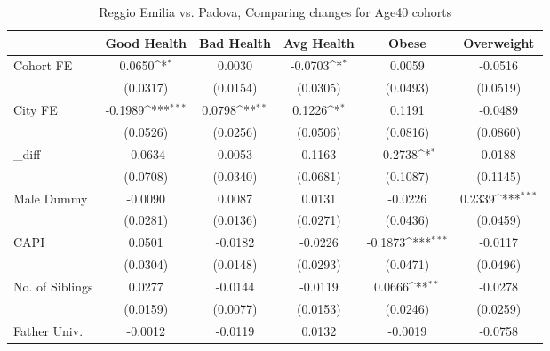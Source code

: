 \begin{table}[htbp]\centering
\def\sym#1{\ifmmode^{#1}\else\(^{#1}\)\fi}
\caption{Reggio Emilia vs. Padova, Comparing changes for Age40 cohorts}
\begin{tabular}{l*{5}{c}}
\toprule
            &\multicolumn{1}{c}{Good Health}&\multicolumn{1}{c}{Bad Health}&\multicolumn{1}{c}{Avg Health}&\multicolumn{1}{c}{Obese}&\multicolumn{1}{c}{Overweight}\\
\midrule
Cohort FE   &      0.0650\sym{*}  &      0.0030         &     -0.0703\sym{*}  &      0.0059         &     -0.0516         \\
            &    (0.0317)         &    (0.0154)         &    (0.0305)         &    (0.0493)         &    (0.0519)         \\
\addlinespace
City FE     &     -0.1989\sym{***}&      0.0798\sym{**} &      0.1226\sym{*}  &      0.1191         &     -0.0489         \\
            &    (0.0526)         &    (0.0256)         &    (0.0506)         &    (0.0816)         &    (0.0860)         \\
\addlinespace
\_diff       &     -0.0634         &      0.0053         &      0.1163         &     -0.2738\sym{*}  &      0.0188         \\
            &    (0.0708)         &    (0.0340)         &    (0.0681)         &    (0.1087)         &    (0.1145)         \\
\addlinespace
Male Dummy  &     -0.0090         &      0.0087         &      0.0131         &     -0.0226         &      0.2339\sym{***}\\
            &    (0.0281)         &    (0.0136)         &    (0.0271)         &    (0.0436)         &    (0.0459)         \\
\addlinespace
CAPI        &      0.0501         &     -0.0182         &     -0.0226         &     -0.1873\sym{***}&     -0.0117         \\
            &    (0.0304)         &    (0.0148)         &    (0.0293)         &    (0.0471)         &    (0.0496)         \\
\addlinespace
No. of Siblings&      0.0277         &     -0.0144         &     -0.0119         &      0.0666\sym{**} &     -0.0278         \\
            &    (0.0159)         &    (0.0077)         &    (0.0153)         &    (0.0246)         &    (0.0259)         \\
\addlinespace
Father Univ.&     -0.0012         &     -0.0119         &      0.0132         &     -0.0019         &     -0.0758         \\

\end{tabular}
\end{table}
